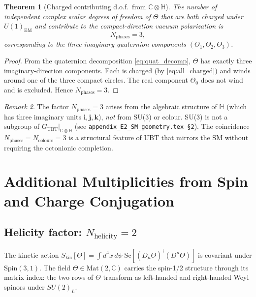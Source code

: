 \documentclass[12pt,a4paper]{article}
\newtheorem{theorem}{Theorem}[section]
\theoremstyle{definition}
\theoremstyle{remark}
\newtheorem{remark}[theorem]{Remark}
\newcommand{\C}{\mathbb{C}}
\renewcommand{\H}{\mathbb{H}}
\begin{document}
\begin{theorem}[Charged contributing d.o.f.\ from $\C \otimes \H$]
\label{thm:N_phases}
  The number of independent complex scalar degrees of freedom of $\Theta$
  that are both \emph{charged under $U(1)_\mathrm{EM}$} and \emph{contribute
  to the compact-direction vacuum polarization} is
  \begin{equation}
    N_{\mathrm{phases}} = 3,
    \label{eq:N_phases}
  \end{equation}
  corresponding to the three imaginary quaternion components
  $(\Theta_1, \Theta_2, \Theta_3)$.
\end{theorem}

\begin{proof}
  From the quaternion decomposition \eqref{eq:quat_decomp}, $\Theta$ has exactly
  three imaginary-direction components.  Each is charged (by \eqref{eq:all_charged})
  and winds around one of the three compact circles.  The real component $\Theta_0$
  does not wind and is excluded.  Hence $N_\mathrm{phases} = 3$.
\end{proof}

\begin{remark}
  The factor $N_\mathrm{phases} = 3$ arises from the algebraic structure of
  $\H$ (which has three imaginary units $\mathbf{i}, \mathbf{j}, \mathbf{k}$),
  \emph{not} from SU(3) or colour.  SU(3) is not a subgroup of
  $G_\mathrm{UBT}|_{\C \otimes \H}$ (see \texttt{appendix\_E2\_SM\_geometry.tex §2}).
  The coincidence $N_\mathrm{phases} = N_\mathrm{colours} = 3$ is a
  structural feature of UBT that mirrors the SM without requiring
  the octonionic completion.
\end{remark}

\section{Additional Multiplicities from Spin and Charge Conjugation}
\label{sec:multiplicities}

\subsection{Helicity factor: $N_\mathrm{helicity} = 2$}

The kinetic action $S_\mathrm{kin}[\Theta] = \int d^4x\,d\psi\;
\mathrm{Sc}[(D_\mu\Theta)^\dagger(D^\mu\Theta)]$ is covariant under
$\mathrm{Spin}(3,1)$.  The field $\Theta \in \mathrm{Mat}(2,\C)$ carries
the spin-1/2 structure through its matrix index: the two rows of $\Theta$
transform as left-handed and right-handed Weyl spinors under $SU(2)_L$.
\end{document}
